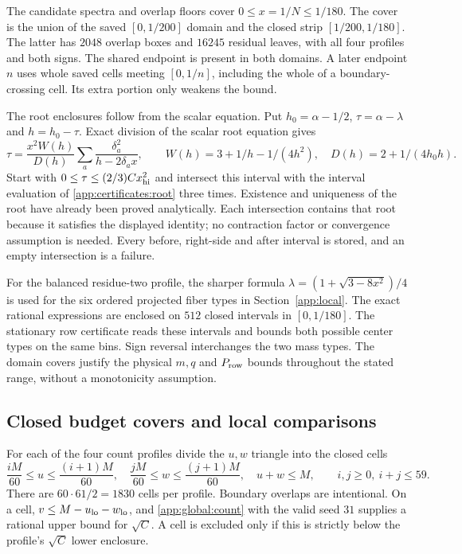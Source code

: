 The candidate spectra and overlap floors cover
$0\le x=1/N\le1/180$. The cover is the union of the saved
$[0,1/200]$ domain and the closed strip $[1/200,1/180]$.
The latter has $2048$ overlap boxes and $16245$ residual leaves, with
all four profiles and both signs. The shared endpoint is present in
both domains. A later endpoint $n$ uses whole saved cells meeting
$[0,1/n]$, including the whole of a boundary-crossing cell. Its extra
portion only weakens the bound.

The root enclosures follow from the scalar equation. Put
$h_0=\alpha-1/2$, $\tau=\alpha-\lambda$ and $h=h_0-\tau$.
Exact division of the scalar root equation gives
\begin{equation}\label{app:certificates:root}
 \tau=\frac{x^2W(h)}{D(h)}
       \sum_a\frac{\delta_a^2}{h-2\delta_ax},\qquad
 W(h)=3+1/h-1/(4h^2),\quad D(h)=2+1/(4h_0h).
\end{equation}
Start with $0\le\tau\le(2/3)C x_{\rm hi}^2$ and intersect this interval
with the interval evaluation of \eqref{app:certificates:root} three
times. Existence and uniqueness of the root have already been
proved analytically. Each intersection contains that root because it
satisfies the displayed identity; no contraction factor or convergence
assumption is needed. Every before, right-side and after interval is
stored, and an empty intersection is a failure.

For the balanced residue-two profile, the sharper formula
$\lambda=(1+\sqrt{3-8x^2})/4$ is used for the six ordered projected
fiber types in Section~\ref{app:local}. The exact rational expressions
are enclosed on $512$ closed intervals in $[0,1/180]$. The stationary
row certificate reads these intervals and bounds both possible center
types on the same bins. Sign reversal interchanges the two mass types.
The domain covers justify the physical $m,q$ and $P_{\rm row}$ bounds
throughout the stated range, without a monotonicity assumption.

\subsection{Closed budget covers and local comparisons}
\label{app:certificates:acceptance}
For each of the four count profiles divide the $u,w$ triangle into the
closed cells
\[
 \frac{iM}{60}\le u\le\frac{(i+1)M}{60},\quad
 \frac{jM}{60}\le w\le\frac{(j+1)M}{60},\quad
 u+w\le M,\qquad i,j\ge0,\ i+j\le59.
\]
There are $60\cdot61/2=1830$ cells per profile. Boundary overlaps are
intentional. On a cell, $v\le M-u_{\rm lo}-w_{\rm lo}$, and
\eqref{app:global:count} with the valid seed $31$ supplies a rational
upper bound for $\sqrt C$. A cell is excluded only if this is strictly
below the profile's $\sqrt C$ lower enclosure.

